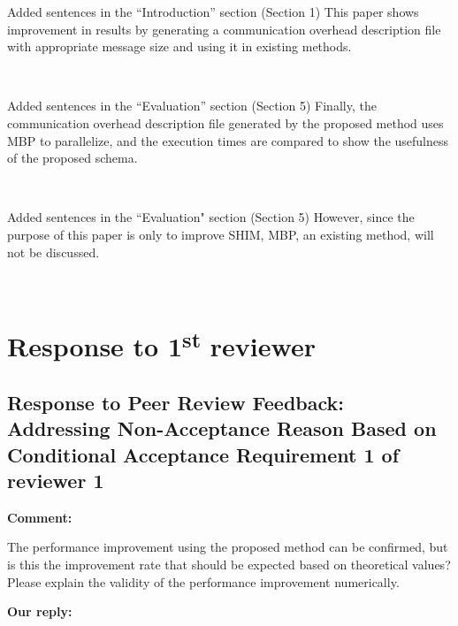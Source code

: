 \documentclass{article}
\newcommand\st{\textsuperscript{st}\xspace}
\begin{document}
\begin{itembox}[|]{Added sentences in the “Introduction” section (Section 1)}
This paper shows improvement in results by generating a communication overhead description file with appropriate message size and using it in existing methods.
\end{itembox}\\

\begin{itembox}[|]{Added sentences in the “Evaluation” section (Section 5)}
Finally, the communication overhead description file generated by the proposed method uses MBP to parallelize, and the execution times are compared to show the usefulness of the proposed schema.
\end{itembox}\\

\begin{itembox}[|]{Added sentences in the ``Evaluation" section (Section 5)}
However, since the purpose of this paper is only to improve SHIM, MBP, an existing method, will not be discussed.
\end{itembox}\\



\newpage
\section{Response to 1\st reviewer}
\subsection{Response to Peer Review Feedback: Addressing Non-Acceptance Reason Based on Conditional Acceptance Requirement 1 of reviewer 1}
\begin{flushleft}
  \textbf{Comment:}

\end{flushleft}
\begin{adjustwidth}{1cm}{1cm}  %
The performance improvement using the proposed method can be confirmed, but is this the improvement rate that should be expected based on theoretical values? Please explain the validity of the performance improvement numerically.
\end{adjustwidth}
    
    
\begin{flushleft}
  \textbf{Our reply:}
\end{flushleft}
\end{document}
